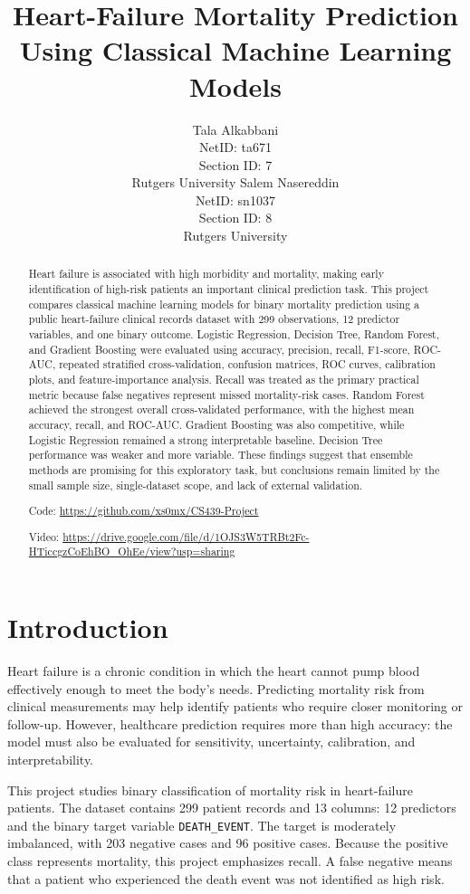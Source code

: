 \documentclass{article}
\title{Heart-Failure Mortality Prediction Using Classical Machine Learning Models}
\author{
  Tala Alkabbani \\
  NetID: ta671 \\
  Section ID: 7 \\
  Rutgers University
  \And
  Salem Nasereddin \\
  NetID: sn1037 \\
  Section ID: 8 \\
  Rutgers University
}
\begin{document}
\maketitle

\begin{abstract}
Heart failure is associated with high morbidity and mortality, making early identification of high-risk patients an important clinical prediction task. This project compares classical machine learning models for binary mortality prediction using a public heart-failure clinical records dataset with 299 observations, 12 predictor variables, and one binary outcome. Logistic Regression, Decision Tree, Random Forest, and Gradient Boosting were evaluated using accuracy, precision, recall, F1-score, ROC-AUC, repeated stratified cross-validation, confusion matrices, ROC curves, calibration plots, and feature-importance analysis. Recall was treated as the primary practical metric because false negatives represent missed mortality-risk cases. Random Forest achieved the strongest overall cross-validated performance, with the highest mean accuracy, recall, and ROC-AUC. Gradient Boosting was also competitive, while Logistic Regression remained a strong interpretable baseline. Decision Tree performance was weaker and more variable. These findings suggest that ensemble methods are promising for this exploratory task, but conclusions remain limited by the small sample size, single-dataset scope, and lack of external validation.

\medskip
\noindent Code: \url{https://github.com/xs0mx/CS439-Project}

\noindent Video: \url{https://drive.google.com/file/d/1OJS3W5TRBt2Fc-HTiccgzCoEhBO_OhEe/view?usp=sharing}
\end{abstract}

\section{Introduction}

Heart failure is a chronic condition in which the heart cannot pump blood effectively enough to meet the body's needs. Predicting mortality risk from clinical measurements may help identify patients who require closer monitoring or follow-up. However, healthcare prediction requires more than high accuracy: the model must also be evaluated for sensitivity, uncertainty, calibration, and interpretability.

This project studies binary classification of mortality risk in heart-failure patients. The dataset contains 299 patient records and 13 columns: 12 predictors and the binary target variable \texttt{DEATH\_EVENT}. The target is moderately imbalanced, with 203 negative cases and 96 positive cases. Because the positive class represents mortality, this project emphasizes recall. A false negative means that a patient who experienced the death event was not identified as high risk.
\end{document}
